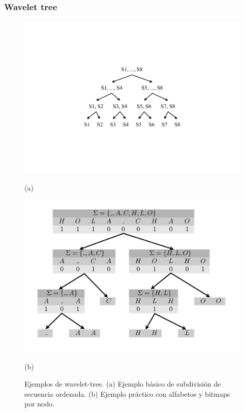 \begin{frame}
\frametitle{Wavelet tree}

\begin{figure}%
    	\centering
    	\begin{minipage}{0.4\textwidth}
    		\centering
    		\includegraphics[scale=.3, clip,  trim=230 182 230 180]{../img/arte/graphs-wavelet-tree.pdf}
    		
    		(a)
    	\end{minipage}
    	\begin{minipage}{0.5\textwidth}
    		\centering
    		\includegraphics[scale=.2, clip, trim=0 0 0 0]{../img/arte/graphs-wavelet-tree2.pdf}

    		(b)
    	\end{minipage}

    \caption{Ejemplos de wavelet-tree. (a) Ejemplo básico de subdivisión de secuencia ordenada. (b) Ejemplo práctico con alfabetos y bitmaps por nodo.}
\end{figure}

\end{frame}


